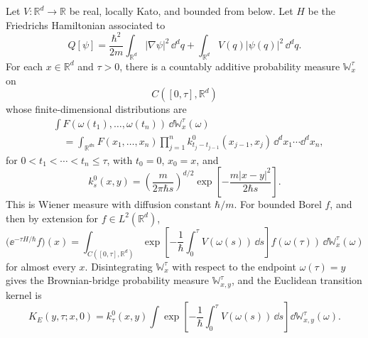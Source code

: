 \begin{theorem}
\label{thm:wiener-feynman-kac-qm}
Let \(V:\mathbb R^d\to\mathbb R\) be real, locally Kato, and bounded from
below.  Let \(H\) be the Friedrichs Hamiltonian associated to
\[
  Q[\psi]
  =
  \frac{\hbar^2}{2m}\int_{\mathbb R^d}|\nabla\psi|^2\,\dd^dq
  +
  \int_{\mathbb R^d}V(q)|\psi(q)|^2\,\dd^dq .
\]
For each \(x\in\mathbb R^d\) and \(\tau>0\), there is a countably additive
probability measure \(\mathbb W_x^\tau\) on
\[
  C([0,\tau],\mathbb R^d)
\]
whose finite-dimensional distributions are
\[
\begin{aligned}
  &\int F(\omega(t_1),\ldots,\omega(t_n))\,
  \dd\mathbb W_x^\tau(\omega)  \\
  &\quad =
  \int_{\mathbb R^{dn}}
  F(x_1,\ldots,x_n)
  \prod_{j=1}^n k^0_{t_j-t_{j-1}}(x_{j-1},x_j)\,
  \dd^dx_1\cdots\dd^dx_n ,
\end{aligned}
\]
for \(0<t_1<\cdots<t_n\le\tau\), with \(t_0=0\), \(x_0=x\), and
\[
  k^0_s(x,y)
  =
  \left(\frac{m}{2\pi\hbar s}\right)^{d/2}
  \exp\left[-\frac{m|x-y|^2}{2\hbar s}\right].
\]
This is Wiener measure with diffusion constant \(\hbar/m\).  For bounded
Borel \(f\), and then by extension for \(f\in L^2(\mathbb R^d)\),
\[
  \bigl(\ee^{-\tau H/\hbar}f\bigr)(x)
  =
  \int_{C([0,\tau],\mathbb R^d)}
  \exp\left[
    -\frac1\hbar\int_0^\tau V(\omega(s))\,\dd s
  \right]
  f(\omega(\tau))\,
  \dd\mathbb W_x^\tau(\omega)
\]
for almost every \(x\).  Disintegrating \(\mathbb W_x^\tau\) with respect to
the endpoint \(\omega(\tau)=y\) gives the Brownian-bridge probability measure
\(\mathbb W_{x,y}^\tau\), and the Euclidean transition kernel is
\[
  K_E(y,\tau;x,0)
  =
  k^0_\tau(x,y)
  \int
  \exp\left[
    -\frac1\hbar\int_0^\tau V(\omega(s))\,\dd s
  \right]
  \dd\mathbb W_{x,y}^\tau(\omega).
\]
\end{theorem}

